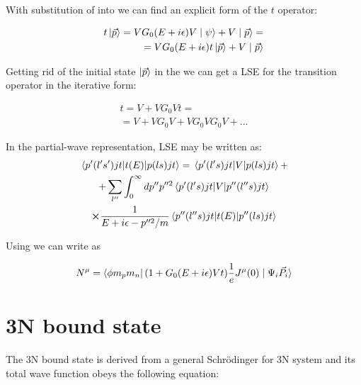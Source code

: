     With substitution of  into  we can find
    an explicit form of the $t$ operator:

    \begin{eqnarray}
        t \ket{\vec{p}} = V G_0(E + i\epsilon)V \mid \psi \rangle +  V \mid \vec{p} \rangle = \nonumber\\
        = V G_0(E + i\epsilon) t \ket{\vec{p}} +  V \mid \vec{p} \rangle
        \label{top2}
    \end{eqnarray}

    Getting rid of the initial state $\ket{\vec{p}}$ in the  we can get a LSE
    for the transition operator in the iterative form:

    \begin{eqnarray}
        t = V + V G_0V t = \nonumber\\
        = V + V G_0 V + V G_0 V G_0V + ...
    \end{eqnarray}

    In the partial-wave representation, LSE  may be written as:
    \begin{multline}
        \matrixel{p^\prime (l^\prime s^\prime)jt}{t(E)}{p(ls)jt} = 
        \matrixel{p^\prime (l^\prime s)jt}{V}{p(ls)jt} + \\
        +\sum_{l^{\prime\prime}} \int_0^\infty dp^{\prime \prime} p^{\prime \prime 2}
        \matrixel{p^\prime (l^\prime s)jt}{V}{p^{\prime\prime}(l^{\prime\prime} s)jt} \\
        \cross \frac{1}{E + i\epsilon - p^{\prime \prime 2}/m}
        \matrixel{p^{\prime \prime} (l^{\prime \prime} s)jt}{t(E)}{p^{\prime\prime}(l s)jt}
        \label{lse_pwd}
    \end{multline}

    Using  we can write  as
    
    \begin{equation}
        N^\mu = \bra{\phi m_p m_n} (1 + G_0(E + i\epsilon)V t) \frac{1}{e}J^\mu(0) \mid \Psi_i \vec{P_i} \rangle
        \label{main_top}
    \end{equation}

    
\section{3N bound state}

    The 3N bound state is derived from a general Schr\"{o}dinger for 3N system
    and its total wave function obeys the following equation:

